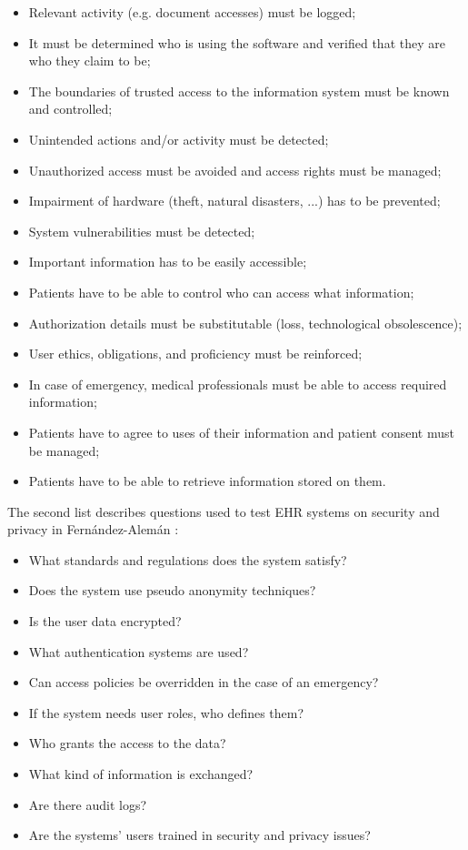 \begin{itemize}
	\item Relevant activity (e.g. document accesses) must be logged;
	\item It must be determined who is using the software and verified that they are who they claim to be;
	\item The boundaries of trusted access to the information system must be known and controlled;
	\item Unintended actions and/or activity must be detected;
	\item Unauthorized access must be avoided and access rights must be managed;
	\item Impairment of hardware (theft, natural disasters, ...) has to be prevented;
	\item System vulnerabilities must be detected;
	\item Important information has to be easily accessible;
	\item Patients have to be able to control who can access what information;
	\item Authorization details must be substitutable (loss, technological obsolescence);
	\item User ethics, obligations, and proficiency must be reinforced;
	\item In case of emergency, medical professionals must be able to access required information;
	\item Patients have to agree to uses of their information and patient consent must be managed;
	\item Patients have to be able to retrieve information stored on them.
\end{itemize}

The second list describes questions used to test EHR systems on security and privacy in Fernández-Alemán \cite{s8FernandezAleman2013}:
\begin{itemize}
	\item What standards and regulations does the system satisfy?
	\item Does the system use pseudo anonymity techniques?
	\item Is the user data encrypted? 
	\item What authentication systems are used? 
	\item Can access policies be overridden in the case of an emergency? 
	\item If the system needs user roles, who defines them? 
	\item Who grants the access to the data? 
	\item What kind of information is exchanged? 
	\item Are there audit logs?
	\item Are the systems' users trained in security and privacy issues? 
\end{itemize}
